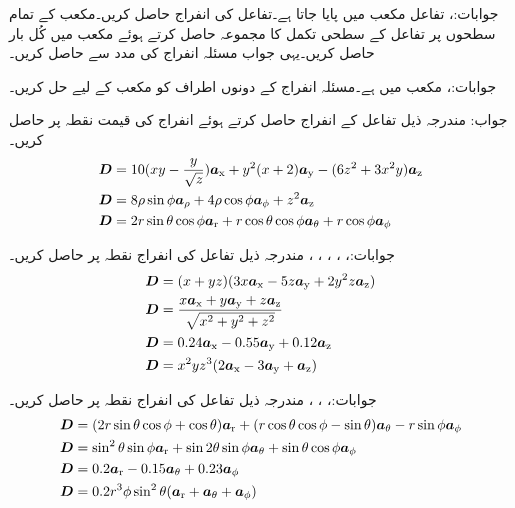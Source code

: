 جوابات:، 
تفاعل  مکعب  میں پایا جاتا ہے۔تفاعل کی انفراج  حاصل کریں۔مکعب کے تمام سطحوں پر تفاعل کے سطحی تکمل کا مجموعہ حاصل کرتے ہوئے مکعب میں کُل بار حاصل کریں۔یہی جواب مسئلہ انفراج  کی مدد سے حاصل کریں۔

جوابات:، 
مکعب  میں  ہے۔مسئلہ انفراج کے دونوں اطراف کو مکعب کے لیے حل کریں۔

جواب:
مندرجہ ذیل تفاعل کے انفراج حاصل کرتے ہوئے انفراج کی قیمت نقطہ  پر حاصل کریں۔
\begin{align*}
\kvec{D}&=10(xy-\frac{y}{\sqrt{z}})\ax+y^2(x+2)\ay-(6z^2+3x^2y)\az\\
\kvec{D}&=8\rho \sin \phi \arho+4\rho \cos \phi \aphi+z^2\az\\
\kvec{D}&=2 r \sin \theta \cos \phi\ar +r \cos \theta \cos \phi \atheta+r \cos \phi \aphi
\end{align*}

جوابات:، ، ، ، ، 
مندرجہ ذیل تفاعل کی انفراج نقطہ  پر حاصل کریں۔
\begin{align*}
\kvec{D}&=(x+yz)(3x\ax-5z\ay+2y^2z\az)\\
\kvec{D}&=\frac{x\ax+y\ay+z\az}{\sqrt{x^2+y^2+z^2}}\\
\kvec{D}&=0.24\ax-0.55\ay+0.12\az\\
\kvec{D}&=x^2yz^3(2\ax-3\ay+\az)
\end{align*}

جوابات:، ، ، 
مندرجہ ذیل تفاعل کی انفراج نقطہ  پر حاصل کریں۔
\begin{align*}
\kvec{D}&=(2r\sin\theta\cos\phi+\cos\theta)\ar+(r\cos\theta\cos\phi-\sin\theta)\atheta-r\sin\phi\aphi\\
\kvec{D}&=\sin^2\theta\sin\phi\ar+\sin 2\theta \sin \phi\atheta+\sin\theta\cos\phi\aphi\\
\kvec{D}&=0.2\ar-0.15\atheta+0.23\aphi\\
\kvec{D}&=0.2r^3 \phi \sin^2 \theta (\ar+\atheta+\aphi)
\end{align*}

